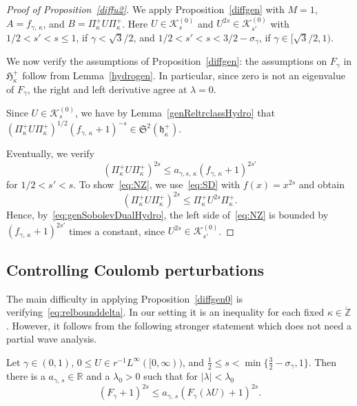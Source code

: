 \documentclass[AHL,Unicode,longabstracts,published]{cedram}
\newcommand*\gz{\mathbb{Z}}
\newcommand*\rz{\mathbb{R}}
\newcommand*\zp{\dot{\gz}}
\newcommand*\cK{\mathcal{K}}
\newcommand*\gH{\mathfrak{H}}
\newcommand*\gh{\mathfrak{h}}
\newcommand*\gS{\mathfrak{S}}
\newcommand*\ghpk{{\gh^+_\kappa}}
\newcommand*\ppp{\Pi^+_\kappa}
\begin{document}
\begin{proof}[Proof of Proposition~\ref{diffu2}]
We apply Proposition~\ref{diffgen} with $M=1$, $A = f_{\gamma,\,\kappa}$, and $B = \Pi_\kappa^+ U\Pi^+_\kappa$. Here $U\in\cK_{s}^{(0)}$ and $U^{2s}\in\cK_{s'}^{(0)}$ with $1/2<s'<s\leq1$, if $\gamma<\sqrt3/2$, and $1/2<s'<s<3/2-\sigma_\gamma$, if $\gamma\in[\sqrt3/2,1)$.

We now verify the assumptions of Proposition~\ref{diffgen}: the assumptions on $F_{\gamma}$ in $\gH_\kappa^+$ follow from Lemma~\ref{hydrogen}. In particular, since zero is not an eigenvalue of $F_{\gamma}$, the right and left derivative agree at $\lambda=0$.

Since $U\in\cK_{s}^{(0)}$, we have by Lemma~\ref{genReltrclassHydro} that $(\ppp U\ppp)^{1/2}(f_{\gamma,\,\kappa}+1)^{-s}\in \gS^2(\ghpk).$


Eventually, we verify
\begin{equation}\label{eq:NZ}
\left(\Pi_\kappa^+ U \Pi_\kappa^+\right)^{2s}
\leq a_{\gamma,s,\,\kappa}\left(f_{\gamma,\,\kappa}+1\right)^{2s'}
\end{equation}
for $1/2<s'<s$. To show~\eqref{eq:NZ}, we use~\eqref{eq:SD} with $f(x)=x^{2s}$ and obtain
\[
\left(\Pi^+_\kappa U \ppp\right)^{2s}
\leq \Pi_\kappa^+ U^{2s} \Pi_\kappa^+.
\]
Hence, by~\eqref{eq:genSobolevDualHydro}, the left side of~\eqref{eq:NZ} is bounded by $(f_{\gamma,\,\kappa}+1)^{2s'}$ times a constant, since $U^{2s}\in\cK_{s'}^{(0)}$.
\end{proof}

\subsection{Controlling Coulomb perturbations}\label{ss:controlingcoulomb}

The main difficulty in applying Proposition~\ref{diffgen0} is verifying~\eqref{eq:relbounddelta}. In our setting it is an inequality for each fixed $\kappa\in \zp$. However, it follows from the following stronger statement which does not need a partial wave analysis.
\begin{lemm}\label{boundpertcoulomb}
Let $\gamma\in(0,1)$, $0\leq U\in r^{-1}L^\infty([0,\infty))$, and $\tfrac12\leq s<\min\{\tfrac32-\sigma_\gamma,1\}$. Then there is a $a_{\gamma,\,s}\in\rz$ and a $\lambda_0>0$ such that for $|\lambda|<\lambda_0$
\begin{equation}
\left(F_\gamma+1\right)^{2s}
\leq a_{\gamma,\,s} \left(F_{\gamma}(\lambda U)+1\right)^{2s}.
\end{equation}
\end{lemm}
\end{document}
